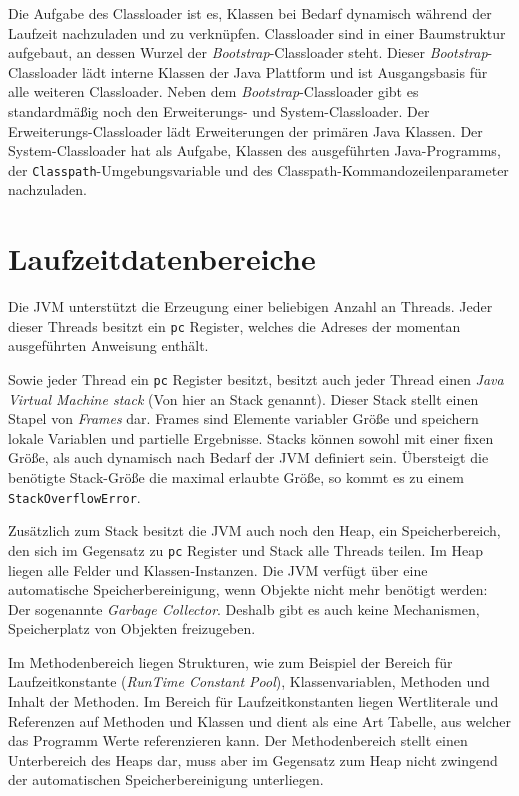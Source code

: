 Die Aufgabe des Classloader ist es, Klassen bei Bedarf dynamisch während der Laufzeit nachzuladen und zu verknüpfen. Classloader sind in einer Baumstruktur aufgebaut, an dessen Wurzel der \textit{Bootstrap}-Classloader steht. Dieser \textit{Bootstrap}-Classloader lädt interne Klassen der Java Plattform und ist Ausgangsbasis für alle weiteren Classloader. Neben dem \textit{Bootstrap}-Classloader gibt es standardmäßig noch den Erweiterungs- und System-Classloader. Der Erweiterungs-Classloader lädt Erweiterungen der primären Java Klassen. Der System-Classloader hat als Aufgabe, Klassen des ausgeführten Java-Programms, der \texttt{Classpath}-Umgebungsvariable und des Classpath-Kommandozeilen\-parameter nachzuladen.

\section{Laufzeitdatenbereiche}

Die JVM unterstützt die Erzeugung einer beliebigen Anzahl an Threads. Jeder dieser Threads besitzt ein \texttt{pc} Register, welches die Adreses der momentan ausgeführten Anweisung enthält.

Sowie jeder Thread ein \texttt{pc} Register besitzt, besitzt auch jeder Thread einen \textit{Java Virtual Machine stack} (Von hier an Stack genannt). Dieser Stack stellt einen Stapel von \textit{Frames} dar. Frames sind Elemente variabler Größe und speichern lokale Variablen und partielle Ergebnisse. Stacks können sowohl mit einer fixen Größe, als auch dynamisch nach Bedarf der JVM definiert sein. Übersteigt die benötigte Stack-Größe die maximal erlaubte Größe, so kommt es zu einem \texttt{StackOverflowError}.

Zusätzlich zum Stack besitzt die JVM auch noch den Heap, ein Speicherbereich, den sich im Gegensatz zu \texttt{pc} Register und Stack alle Threads teilen. Im Heap liegen alle Felder und Klassen-Instanzen. Die JVM verfügt über eine automatische Speicherbereinigung, wenn Objekte nicht mehr benötigt werden: Der sogenannte \textit{Garbage Collector}. Deshalb gibt es auch keine Mechanismen, Speicherplatz von Objekten freizugeben.

Im Methodenbereich liegen Strukturen, wie zum Beispiel der Bereich für Laufzeitkonstante (\textit{Run\-Time Constant Pool}), Klassenvariablen, Methoden und Inhalt der Methoden. Im Bereich für Laufzeitkonstanten liegen Wertliterale und Referenzen auf Methoden und Klassen und dient als eine Art Tabelle, aus welcher das Programm Werte referenzieren kann.  Der Methodenbereich stellt einen Unterbereich des Heaps dar, muss aber im Gegensatz zum Heap nicht zwingend der automatischen Speicherbereinigung unterliegen.

